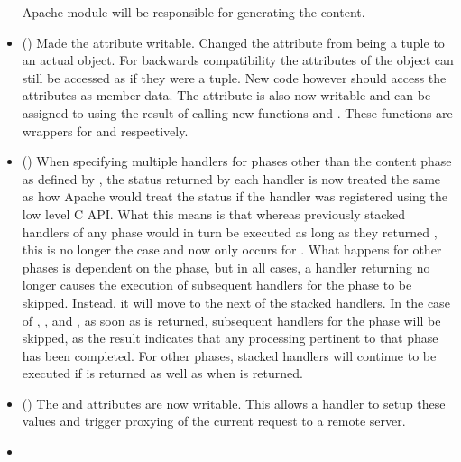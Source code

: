 \begin{itemize}
      Apache module will be responsible for generating the content.
    \item
      ()
      Made the  attribute writable. Changed
      the  attribute from being a tuple to an actual object.
      For backwards compatibility the attributes of the object can still be
      accessed as if they were a tuple. New code however should access
      the attributes as member data. The  attribute is
      also now writable and can be assigned to using the result of calling
      new functions  and . These
      functions are wrappers for  and 
      respectively.
    \item
      ()
      When specifying multiple handlers for phases other than the content
      phase as defined by , the status returned by each
      handler is now treated the same as how Apache would treat the status
      if the handler was registered using the low level C API. What this
      means is that whereas previously stacked handlers of any phase would
      in turn be executed as long as they returned , this
      is no longer the case and now only occurs for .
      What happens for other phases is dependent on the phase, but in all
      cases, a handler returning  no longer causes
      the execution of subsequent handlers for the phase to be skipped.
      Instead, it will move to the next of the stacked handlers. In the
      case of , ,
       and , as soon
      as  is returned, subsequent handlers for the phase
      will be skipped, as the result indicates that any processing pertinent
      to that phase has been completed. For other phases, stacked handlers
      will continue to be executed if  is returned as well
      as when  is returned.
    \item
      ()
      The  and  attributes are now writable.
      This allows a handler to setup these values and trigger proxying of the
      current request to a remote server.
    \item

\end{itemize}
